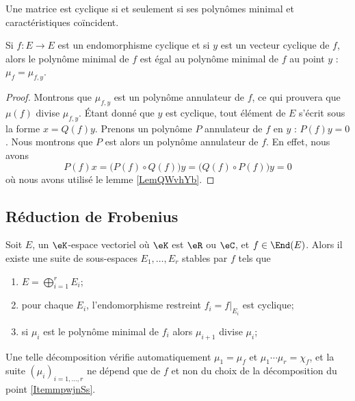 \begin{lemma}   \label{LemSGmdnE}
    Une matrice est cyclique si et seulement si ses polynômes minimal et caractéristiques coïncident.
\end{lemma}

\begin{lemma}   \label{LemAGZNNa}
    Si \( f\colon E\to E\) est un endomorphisme cyclique et si \( y\) est un vecteur cyclique de \( f\), alors le polynôme minimal de \( f\) est égal au polynôme minimal de \( f\) au point \( y\) : \( \mu_{f}=\mu_{f,y}\).
\end{lemma}

\begin{proof}
    Montrons que \( \mu_{f,y}\) est un polynôme annulateur de \( f\), ce qui prouvera que \( \mu(f)\) divise \( \mu_{f,y}\). Étant donné que \( y\) est cyclique, tout élément de \( E\) s'écrit sous la forme \( x=Q(f)y\). Prenons un polynôme \( P\) annulateur de \( f\) en \( y\) : \( P(f)y=0\). Nous montrons que \( P\) est alors un polynôme annulateur de \( f\). En effet, nous avons
    \begin{equation}
        P(f)x=\big( P(f)\circ Q(f) \big)y=\big( Q(f)\circ P(f) \big)y=0
    \end{equation}
    où nous avons utilisé le lemme \ref{LemQWvhYb}.
\end{proof}

\subsection{Réduction de Frobenius}

\begin{theorem}      
    Soit \( E\), un \( \eK\)-espace vectoriel où \( \eK\) est \( \eR\) ou \( \eC\), et \( f\in \End(E)\). Alors il existe une suite de sous-espaces \( E_1,\ldots, E_r\) stables par \( f\) tels que
    \begin{enumerate}
        \item   \label{ItemmpwjnSs}
            \( E=\bigoplus_{i=1}^rE_i\);
        \item
            pour chaque \( E_i\), l'endomorphisme restreint \( f_i=f|_{E_i}\) est cyclique;
        \item
            si \( \mu_i\) est le polynôme minimal de \( f_i\) alors \( \mu_{i+1}\) divise \( \mu_i\);
    \end{enumerate}
    Une telle décomposition vérifie automatiquement \( \mu_1=\mu_f\) et \( \mu_1\cdots \mu_r=\chi_f\), et la suite \( (\mu_i)_{i=1,\ldots, r}\) ne dépend que de \( f\) et non du choix de la décomposition du point \ref{ItemmpwjnSs}.
\end{theorem}

